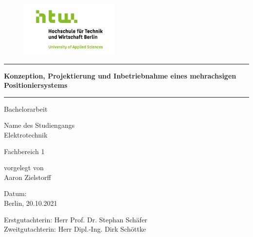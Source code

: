 \documentclass[12pt, a4paper, twoside]{article} %
\begin{document}
\begin{titlepage}

	\vspace*{-2.0cm}

	\begin{figure}[h]\centering
		\includegraphics[width=5cm]{Images/HTW_Logo.png}
	\end{figure}

	\begin{center}
	\vspace*{-1.59cm}

	\par\noindent\rule{\textwidth}{0.4pt}
	\huge
	\textcolor{htw}{\textbf{Konzeption, Projektierung und Inbetriebnahme eines mehrachsigen Positioniersystems}}
	\par\noindent\rule{\textwidth}{0.4pt}
	\vspace*{2.0cm}
	\Large
	Bachelorarbeit
	
	\normalsize
	Name des Studiengangs\\
	\vspace*{0.4cm}
	\Large
	Elektrotechnik
	
	\vspace*{0.6cm}
	\Large
	\textcolor{htw}{Fachbereich 1}
	
	\vspace*{0.6cm}
	\normalsize
	vorgelegt von\\
	\vspace*{0.4cm}
	\Large
	Aaron Zielstorff
	
	\vspace*{3.0cm}
	\small
	Datum:\\
	\normalsize
	Berlin, 20.10.2021
	
	\vspace*{1.6cm}
	\normalsize
	Erstgutachter\textunderscore in: Herr Prof. Dr. Stephan Schäfer\\
	Zweitgutachter\textunderscore in: Herr Dipl.-Ing. Dirk Schöttke
	
	\end{center}
\end{titlepage}


\pagestyle{empty}
\setcounter{tocdepth}{3} %
\tableofcontents
\clearpage
\end{document}
